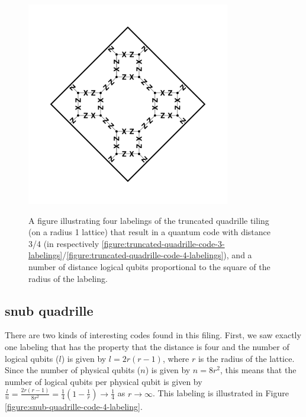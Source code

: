 \documentclass[12pt]{amsbook}
\theoremstyle{plain}
\theoremstyle{definition}
\theoremstyle{remark}
\newcommand{\paren}[1]{\left(#1\right)}
\begin{document}
\begin{figure}
{\includegraphics[width=3.5in]{images/truncated-quadrille-code-4-labeling-2}}\\
\caption{
\label{figure:truncated-quadrille-code-labelings}
A figure illustrating four labelings of the truncated quadrille tiling (on a radius 1 lattice) that result in a quantum code with distance 3/4 (in respectively \ref{figure:truncated-quadrille-code-3-labelings}/\ref{figure:truncated-quadrille-code-4-labelings}), and a number of distance logical qubits proportional to the square of the radius of the labeling.
}
\end{figure}
\subsection{snub quadrille}


There are two kinds of interesting codes found in this filing.  First, we saw exactly one labeling that has the property that the distance is four and the number of logical qubits ($l$) is given by $l=2r(r-1)$, where $r$ is the radius of the lattice.  Since the number of physical qubits ($n$) is given by $n=8r^2$, this means that the number of logical qubits per physical qubit is given by $\frac{l}{n}=\frac{2r(r-1)}{8r^2}=\frac{1}{4}\paren{1-\frac{1}{r}}\to\frac{1}{4}$ as $r\to\infty$.  This labeling is illustrated in Figure \ref{figure:snub-quadrille-code-4-labeling}.
\end{document}

